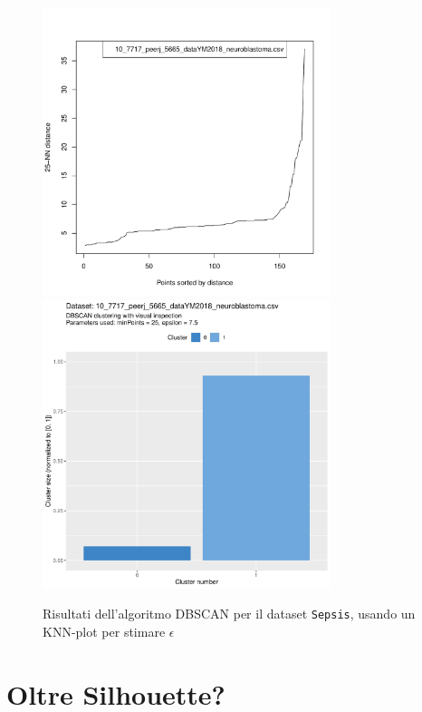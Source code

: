 \documentclass[a4paper, 12pt]{report}
\begin{document}
			\begin{figure}[H]
				\centering
				\includegraphics[width = 0.75\textwidth, height = 0.45\textheight, page = 5]{
					doc/DBSCAN_optimal_MinPts.pdf
				}
				\includegraphics[width = 0.75\textwidth, height = 0.45\textheight, page = 5]{
					results/DBSCAN_visual_comparison.pdf
				}
				\caption{Risultati dell'algoritmo DBSCAN per il dataset
				\texttt{Sepsis}, usando un KNN-plot per stimare $\epsilon$}
				\label{fig:dbscan-extra5}
			\end{figure}

		\section{Oltre Silhouette?}
\end{document}
